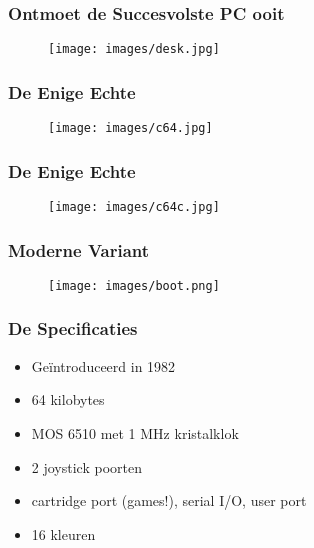 \documentclass[aspectratio=43]{uva-inf-presentation}
\begin{document}

\begin{frame}
\frametitle{Ontmoet de Succesvolste PC ooit}

\begin{figure}
\texttt{[image: images/desk.jpg]}
\end{figure}

\end{frame}


\begin{frame}
\frametitle{De Enige Echte}

\begin{figure}
\texttt{[image: images/c64.jpg]}
\end{figure}

\end{frame}


\begin{frame}
\frametitle{De Enige Echte}

\begin{figure}
\texttt{[image: images/c64c.jpg]}
\end{figure}

\end{frame}


\begin{frame}
\frametitle{Moderne Variant}

\begin{figure}
\texttt{[image: images/boot.png]}
\end{figure}

\end{frame}


\begin{frame}
\frametitle{De Specificaties}

\begin{itemize}
\item Ge\"introduceerd in 1982
\item 64 kilobytes
\item MOS 6510 met 1 MHz kristalklok
\item 2 joystick poorten
\item cartridge port (games!), serial I/O, user port
\item 16 kleuren
\end{itemize}

\end{frame}
\end{document}
